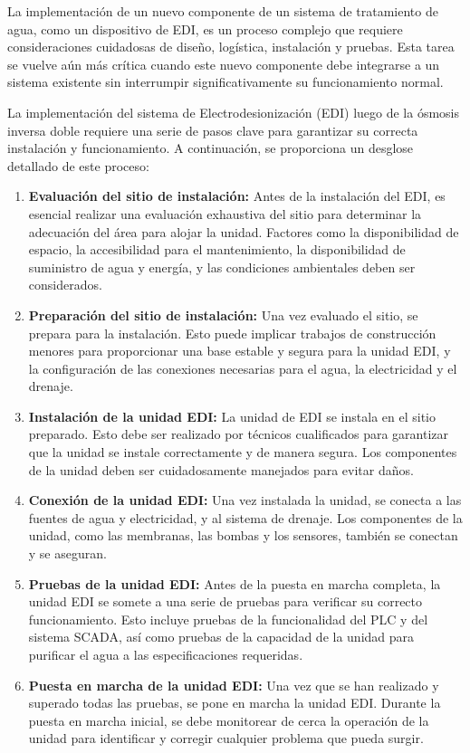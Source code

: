 La implementación de un nuevo componente de un sistema de tratamiento de agua,
como un dispositivo de EDI, es un proceso complejo que requiere consideraciones
cuidadosas de diseño, logística, instalación y pruebas. Esta tarea se vuelve
aún más crítica cuando este nuevo componente debe integrarse a un sistema
existente sin interrumpir significativamente su funcionamiento normal.

La implementación del sistema de Electrodesionización (EDI) luego de la ósmosis inversa doble requiere una serie de pasos clave para garantizar su correcta instalación y funcionamiento. A continuación, se proporciona un desglose detallado de este proceso:

\begin{enumerate}
    \item \textbf{Evaluación del sitio de instalación:} Antes de la instalación del EDI, es esencial realizar una evaluación exhaustiva del sitio para determinar la adecuación del área para alojar la unidad. Factores como la disponibilidad de espacio, la accesibilidad para el mantenimiento, la disponibilidad de suministro de agua y energía, y las condiciones ambientales deben ser considerados.

    \item \textbf{Preparación del sitio de instalación:} Una vez evaluado el sitio, se prepara para la instalación. Esto puede implicar trabajos de construcción menores para proporcionar una base estable y segura para la unidad EDI, y la configuración de las conexiones necesarias para el agua, la electricidad y el drenaje.

    \item \textbf{Instalación de la unidad EDI:} La unidad de EDI se instala en el sitio preparado. Esto debe ser realizado por técnicos cualificados para garantizar que la unidad se instale correctamente y de manera segura. Los componentes de la unidad deben ser cuidadosamente manejados para evitar daños.

    \item \textbf{Conexión de la unidad EDI:} Una vez instalada la unidad, se conecta a las fuentes de agua y electricidad, y al sistema de drenaje. Los componentes de la unidad, como las membranas, las bombas y los sensores, también se conectan y se aseguran.

    \item \textbf{Pruebas de la unidad EDI:} Antes de la puesta en marcha completa, la unidad EDI se somete a una serie de pruebas para verificar su correcto funcionamiento. Esto incluye pruebas de la funcionalidad del PLC y del sistema SCADA, así como pruebas de la capacidad de la unidad para purificar el agua a las especificaciones requeridas.

    \item \textbf{Puesta en marcha de la unidad EDI:} Una vez que se han realizado y superado todas las pruebas, se pone en marcha la unidad EDI. Durante la puesta en marcha inicial, se debe monitorear de cerca la operación de la unidad para identificar y corregir cualquier problema que pueda surgir.
\end{enumerate}

